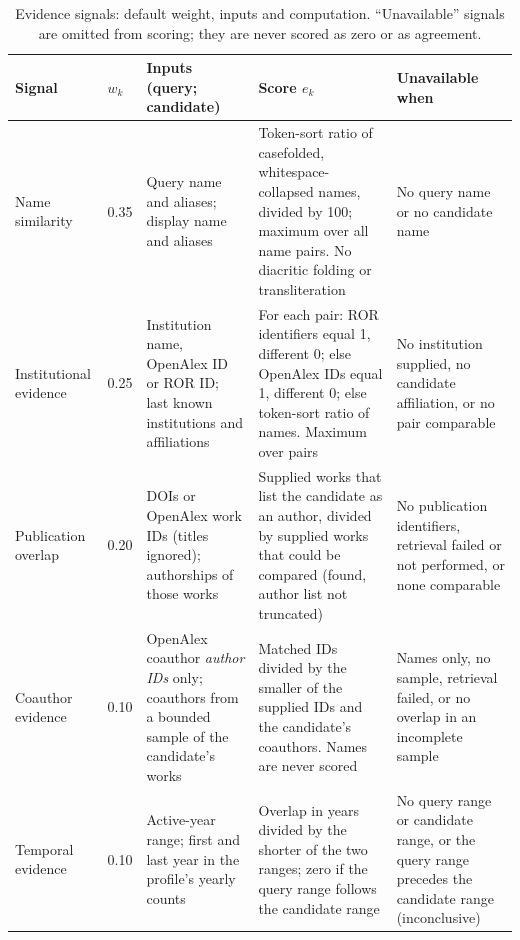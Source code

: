 \begin{table}[t]
\caption{Evidence signals: default weight, inputs and computation. ``Unavailable'' signals are omitted from scoring; they are never scored as zero or as agreement.}
\label{tab:signals}
\centering
\footnotesize
\renewcommand{\arraystretch}{1.12}
\begin{tabular}{@{}p{}p{}p{}p{}p{}@{}}
\toprule
\textbf{Signal} & \textbf{$w_k$} & \textbf{Inputs (query; candidate)} & \textbf{Score $e_k$} & \textbf{Unavailable when} \\
\midrule
Name similarity & 0.35 & Query name and aliases; display name and aliases & Token-sort ratio of casefolded, whitespace-collapsed names, divided by 100; maximum over all name pairs. No diacritic folding or transliteration & No query name or no candidate name \\
Institutional evidence & 0.25 & Institution name, OpenAlex ID or ROR ID; last known institutions and affiliations & For each pair: ROR identifiers equal 1, different 0; else OpenAlex IDs equal 1, different 0; else token-sort ratio of names. Maximum over pairs & No institution supplied, no candidate affiliation, or no pair comparable \\
Publication overlap & 0.20 & DOIs or OpenAlex work IDs (titles ignored); authorships of those works & Supplied works that list the candidate as an author, divided by supplied works that could be compared (found, author list not truncated) & No publication identifiers, retrieval failed or not performed, or none comparable \\
Coauthor evidence & 0.10 & OpenAlex coauthor \emph{author IDs} only; coauthors from a bounded sample of the candidate's works & Matched IDs divided by the smaller of the supplied IDs and the candidate's coauthors. Names are never scored & Names only, no sample, retrieval failed, or no overlap in an incomplete sample \\
Temporal evidence & 0.10 & Active-year range; first and last year in the profile's yearly counts & Overlap in years divided by the shorter of the two ranges; zero if the query range follows the candidate range & No query range or candidate range, or the query range precedes the candidate range (inconclusive) \\
\bottomrule
\end{tabular}
\end{table}

